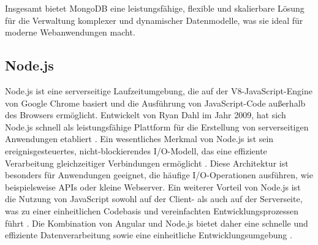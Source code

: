 Insgesamt bietet MongoDB eine leistungsfähige, flexible und skalierbare Lösung für die Verwaltung komplexer und dynamischer Datenmodelle, was sie ideal für moderne Webanwendungen macht.

\subsection{Node.js}
Node.js ist eine serverseitige Laufzeitumgebung, die auf der V8-JavaScript-Engine von Google Chrome basiert und die Ausführung von JavaScript-Code außerhalb des Browsers ermöglicht. 
Entwickelt von Ryan Dahl im Jahr 2009, hat sich Node.js schnell als leistungsfähige Plattform für die Erstellung von serverseitigen Anwendungen etabliert \cite[S.3 ff.]{Cantelon2014}. 
Ein wesentliches Merkmal von Node.js ist sein ereignisgesteuertes, nicht-blockierendes I/O-Modell, das eine effiziente Verarbeitung gleichzeitiger Verbindungen ermöglicht \cite{Tilkov2010}. 
Diese Architektur ist besonders für Anwendungen geeignet, die häufige I/O-Operationen ausführen, wie beispielsweise APIs oder kleine Webserver. 
Ein weiterer Vorteil von Node.js ist die Nutzung von JavaScript sowohl auf der Client- als auch auf der Serverseite, was zu einer einheitlichen Codebasis und vereinfachten Entwicklungsprozessen führt . 
Die Kombination von Angular und Node.js bietet daher eine schnelle und effiziente Datenverarbeitung sowie eine einheitliche Entwicklungsumgebung \cite[S.5 ff.]{Casciaro2020node}.